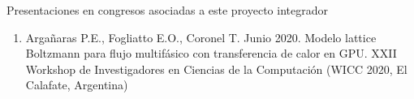\documentclass[12pt,papel,oneside]{ibtesis}
\begin{document}
\appendix
%
%

%
%
%
%

\begin{seccion}{Presentaciones en congresos asociadas a este proyecto integrador}
	
	\begin{enumerate}
		
		\item Argañaras P.E., Fogliatto E.O., Coronel T. Junio 2020. Modelo lattice Boltzmann para flujo multifásico con transferencia de calor en GPU. XXII Workshop de Investigadores en Ciencias de la Computación (WICC 2020, El Calafate, Argentina)
		
	\end{enumerate}
	
\end{seccion}


\begin{biblio}

\end{biblio}
\end{document}
